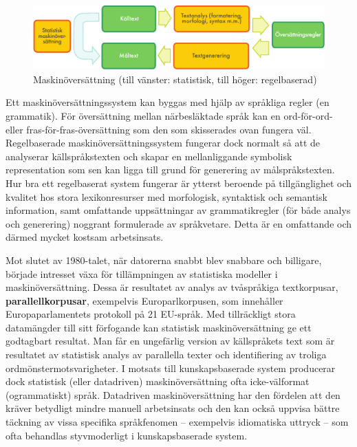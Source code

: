 \begin{multicols}{2}
\begin{figure}[htb]
  \center
  \includegraphics[width=\textwidth]{../_media/swedish/machine_translation}
  \caption{Maskinöversättning (till vänster: statistisk, till höger: regelbaserad)}
  \label{fig:mtarch_sv}
\end{figure}

Ett maskinöversättningssystem kan byggas med hjälp av språkliga regler
(en grammatik). För översättning mellan närbesläktade språk kan en
ord-för-ord- eller fras-för-fras-översättning som den som skisserades
ovan fungera väl. Regelbaserade maskinöversättningssystem fungerar
dock normalt så att de analyserar källspråkstexten och skapar en
mellanliggande symbolisk representation som sen kan ligga till grund
för generering av målspråkstexten. Hur bra ett regelbaserat system
fungerar är ytterst beroende på tillgänglighet och kvalitet hos stora
lexikonresurser med morfologisk, syntaktisk och semantisk information,
samt omfattande uppsättningar av grammatikregler (för både analys och
generering) noggrant formulerade av språkvetare. Detta är en
omfattande och därmed mycket kostsam arbetsinsats.

Mot slutet av 1980-talet, när datorerna snabbt blev snabbare och
billigare, började intresset växa för tillämpningen av statistiska
modeller i maskinöversättning. Dessa är resultatet av analys av
tvåspråkiga textkorpusar, \textbf{parallellkorpusar}, exempelvis
Europarlkorpusen, som innehåller Europaparlamentets protokoll på 21
EU-språk. Med tillräckligt stora data\-mängd\-er till sitt förfogande
kan statistisk maskinöversättning ge ett godtagbart resultat. Man får
en unge\-fär\-lig version av källspråkets text som är resultatet av
statistisk analys av parallella texter och identifiering av troliga
ord\-mönster\-mot\-svarig\-het\-er. I motsats till kunskapsbaserade
system producerar dock statistisk (eller datadriven)
maskinöversättning ofta icke-välformat (ogrammatiskt)
språk. Datadriven maskinöversättning har den fördelen att den kräver
betydligt mindre manuell arbetsinsats och den kan också uppvisa bättre
täckning av vissa specifika språkfenomen -- exempelvis idiomatiska
uttryck -- som ofta behandlas styvmoderligt i kunskapsbaserade system.


\end{multicols}
